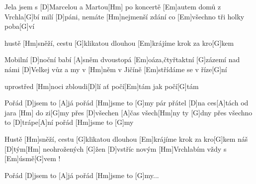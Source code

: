 
Jela jsem s [D]Marcelou a Martou[Hm]\null
po koncertě [Em]autem domů z Vrchla[G]bí
milí [D]páni, nemáte [Hm]nejmenší zdání
co [Em]všechno tři holky poba[G]ví

hustě [Hm]sněží, cestu [G]klikatou dlouhou
[Em]krájíme krok za kro[G]kem

Mobilní [D]noční babí [A]sněm
dvoustopá [Em]oáza,čtyřtaktní [G]zázemí
nad námi [D]Velkej vůz a my v [Hm]něm
v Jičíně [Em]střídáme se v říze[G]ní

uprostřed [Hm]noci zbloudi[D]lí
ať počí[Em]tám jak počí[G]tám

Pořád [D]jsem to [A]já
pořád [Hm]jsme to [G]my
pár přátel [D]na ces[A]tách
od jara [Hm] do zi[G]my
přes [D]všechen [A]\null čas
všech[Hm]ny ty [G]dny
přes všechno to [D]trápe[A]ní
pořád [Hm]jsme to [G]my

Hustě [Hm]sněží, cestu [G]klikatou dlouhou
[Em]krájíme krok za kro[G]kem
náš [D]tým[Hm] neohrožených [G]\null žen
[D]vstříc novým [Hm]Vrchlabím
vždy s [Em]\null úsmě[G]vem !

Pořád [D]jsem to [A]já
pořád [Hm]jsme to [G]my...

